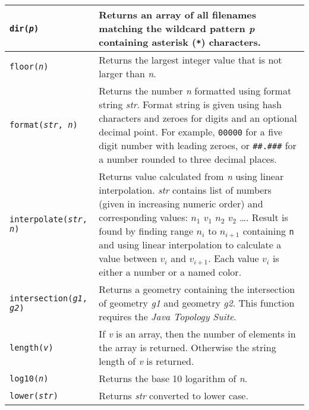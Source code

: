 \begin{longtable}{|p{5cm}|p{7cm}|}
\hline

\texttt{dir(\textit{p})} &
Returns an array of all filenames matching the wildcard
pattern \textit{p} containing asterisk (\texttt{*}) characters. \\

\hline

\texttt{floor(\textit{n})} &
Returns the largest integer value that is not larger than \textit{n}. \\

\hline

\texttt{format(\textit{str}, \textit{n})} &
Returns the number \textit{n} formatted using format string \textit{str}.
Format string is given using hash characters and zeroes for digits
and an optional decimal point.
For example,
\texttt{00000} for a five digit number with leading zeroes,
or
\texttt{\#\#.\#\#\#} for a number rounded to three decimal places.  \\

\hline

\texttt{interpolate(\textit{str}, \textit{n})} &
Returns value calculated from \textit{n} using linear interpolation.
\textit{str} contains list of numbers (given in increasing numeric
order) and corresponding values:
$n_{1}$ $v_{1}$ $n_{2}$ $v_{2}$ \ldots.
Result is found by finding range
$n_{i}$
to
$n_{i+1}$
containing \texttt{n} and
using linear interpolation to calculate a value between
$v_{i}$
and
$v_{i+1}$.
Each value $v_{i}$ is either a number or a named color.  \\

\hline

\texttt{intersection(\textit{g1}, \textit{g2})} &
Returns a geometry containing the intersection
of geometry \textit{g1} and geometry \textit{g2}.
This function requires the \textit{Java Topology Suite}. \\

\hline

\texttt{length(\textit{v})} &
If \textit{v} is an array, then the number of elements in the
array is returned.  Otherwise the string length of \textit{v} is returned. \\

\hline

\texttt{log10(\textit{n})} &
Returns the base 10 logarithm of \textit{n}. \\

\hline

\texttt{lower(\textit{str})} &
Returns \textit{str} converted to lower case. \\


\end{longtable}
